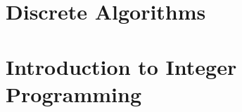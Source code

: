 \documentclass[letter,12pt]{book}
\begin{document}












\part{Discrete Algorithms}


\part{Introduction to Integer Programming}
\label{part:IntroIntegerProgramming}



\appendix




\end{document}
